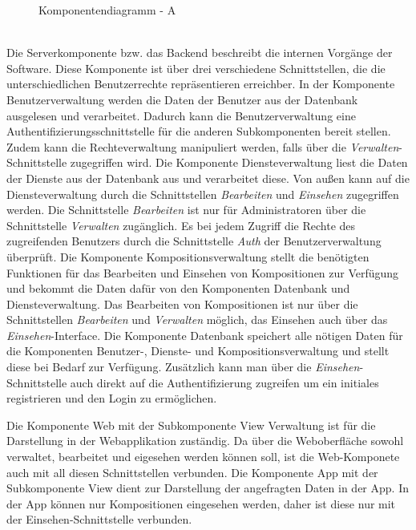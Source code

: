 \begin{figure}[h]
	\centering
	\caption{Komponentendiagramm - A}
	\label{fig:komponentendiagramm-a}
\end{figure}
\\
Die Serverkomponente bzw. das Backend beschreibt die internen Vorgänge der Software.
Diese Komponente ist über drei verschiedene Schnittstellen, die die unterschiedlichen
Benutzerrechte repräsentieren erreichber.
In der Komponente Benutzerverwaltung werden die Daten der Benutzer aus der Datenbank ausgelesen und verarbeitet.
Dadurch kann die Benutzerverwaltung eine Authentifizierungsschnittstelle für die anderen Subkomponenten bereit stellen.
Zudem kann die Rechteverwaltung manipuliert werden, falls über die \textit{Verwalten}-Schnittstelle zugegriffen wird.
Die Komponente Diensteverwaltung liest die Daten der Dienste aus der Datenbank aus und verarbeitet diese.
Von außen kann auf die Diensteverwaltung durch die Schnittstellen \textit{Bearbeiten} und \textit{Einsehen} zugegriffen werden.
Die Schnittstelle \textit{Bearbeiten} ist nur für Administratoren über die Schnittstelle \textit{Verwalten} zugänglich.
Es bei jedem Zugriff die Rechte des zugreifenden Benutzers durch die Schnittstelle \textit{Auth} der Benutzerverwaltung überprüft.
Die Komponente Kompositionsverwaltung stellt die benötigten Funktionen für das Bearbeiten und Einsehen von Kompositionen zur Verfügung und bekommt die Daten dafür von den Komponenten Datenbank und Diensteverwaltung.
Das Bearbeiten von Kompositionen ist nur über die Schnittstellen \textit{Bearbeiten} und \textit{Verwalten} möglich, das Einsehen auch über das \textit{Einsehen}-Interface.
Die Komponente Datenbank speichert alle nötigen Daten für die Komponenten Benutzer-, Dienste- und Kompositionsverwaltung und stellt diese bei Bedarf zur Verfügung.
Zusätzlich kann man über die \textit{Einsehen}-Schnittstelle auch direkt auf die Authentifizierung zugreifen um ein initiales registrieren und den Login zu ermöglichen.

Die Komponente Web mit der Subkomponente View Verwaltung ist für die Darstellung in der Webapplikation zuständig.
Da über die Weboberfläche sowohl verwaltet, bearbeitet und eigesehen werden können soll, ist die Web-Komponete auch mit all diesen Schnittstellen verbunden.
Die Komponente App mit der Subkomponente View dient zur Darstellung der angefragten Daten in der App.
In der App können nur Kompositionen eingesehen werden, daher ist diese nur mit der Einsehen-Schnittstelle verbunden.
